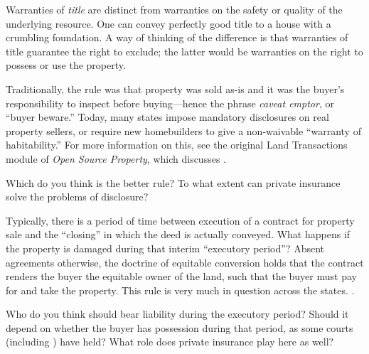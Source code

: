 \item Warranties of \emph{title} are distinct from warranties on the safety or
quality of the underlying resource. One can convey perfectly good title to a
house with a crumbling foundation. A way of thinking of the difference is that
warranties of title guarantee the right to exclude; the latter would be
warranties on the right to possess or use the property.



Traditionally, the rule was that property was sold as-is and it was the buyer's
responsibility to inspect before buying---hence the phrase \emph{caveat emptor},
or ``buyer beware.'' Today, many states impose mandatory disclosures on real
property sellers, or require new homebuilders to give a non-waivable ``warranty
of habitability.'' For more information on this, see the original Land
Transactions module of \emph{Open Source Property}, which discusses
.

Which do you think is the better rule? To what extent can private insurance
solve the problems of disclosure?


\item Typically, there is a period of time between execution of a contract for
property sale and the ``closing'' in which the deed is actually conveyed. What
happens if the property is damaged during that interim ``executory period''?
Absent agreements otherwise, the doctrine of equitable conversion holds that the
contract renders the buyer the equitable owner of the land, such that the buyer
must pay for and take the property. This rule is very much in question across
the states. .

Who do you think should bear liability during the executory period? Should it
depend on whether the buyer has possession during that period, as some courts
(including ) have held? What role does private
insurance play here as well?

